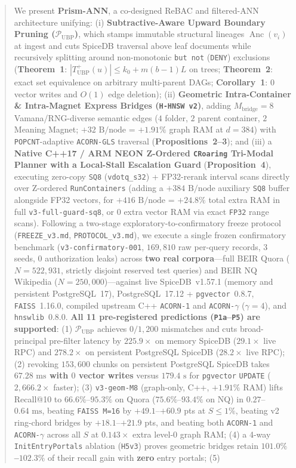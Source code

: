 \documentclass[conference]{IEEEtran}
\begin{document}
\begin{abstract}
We present \textbf{Prism-ANN}, a co-designed ReBAC and filtered-ANN architecture unifying: (i) \textbf{Subtractive-Aware Upward Boundary Pruning ($\mathcal{P}_{\text{UBP}}$)}, which stamps immutable structural lineages $\operatorname{Anc}(v_i)$ at ingest and cuts SpiceDB traversal above leaf documents while recursively splitting around non-monotonic \texttt{but not} (\texttt{DENY}) exclusions (\textbf{Theorem~1}: $|T_{\text{UBP}}^+(u)| \le k_0 + m(b-1)L$ on trees; \textbf{Theorem~2}: exact set equivalence on arbitrary multi-parent DAGs; \textbf{Corollary~1}: $0$ vector writes and $O(1)$ edge deletion); (ii) \textbf{Geometric Intra-Container \& Intra-Magnet Express Bridges (\texttt{H-HNSW v2})}, adding $M_{\text{bridge}}=8$ Vamana/RNG-diverse semantic edges ($4$ folder, $2$ parent container, $2$ Meaning Magnet; $+32\text{ B/node}$ = $+1.91\%$ graph RAM at $d=384$) with \texttt{POPCNT}-adaptive \texttt{ACORN-GLS} traversal (\textbf{Propositions~2--3}); and (iii) a \textbf{Native C++17 / ARM NEON Z-Ordered \texttt{CRoaring} Tri-Modal Planner with a Local-Stall Escalation Guard} (\textbf{Proposition~4}), executing zero-copy \texttt{SQ8} (\texttt{vdotq\_s32}) + FP32-rerank interval scans directly over Z-ordered \texttt{RunContainers} (adding a $+384\text{ B/node}$ auxiliary \texttt{SQ8} buffer alongside FP32 vectors, for $+416\text{ B/node}$ = $+24.8\%$ total extra RAM in full \texttt{v3-full-guard-sq8}, or $0$ extra vector RAM via exact \texttt{FP32} range scans). Following a two-stage exploratory-to-confirmatory freeze protocol (\texttt{FREEZE\_v3.md}, \texttt{PROTOCOL\_v3.md}), we execute a single frozen confirmatory benchmark (\texttt{v3-confirmatory-001}, $169{,}810$ raw per-query records, $3$ seeds, $0$ authorization leaks) across \textbf{two real corpora}---full BEIR Quora ($N=522{,}931$, strictly disjoint reserved test queries) and BEIR NQ Wikipedia ($N=250{,}000$)---against live SpiceDB~v1.57.1 (memory and persistent PostgreSQL~17), PostgreSQL~17.12 + \texttt{pgvector}~0.8.7, \texttt{FAISS}~1.16.0, compiled upstream C++ \texttt{ACORN-1} and \texttt{ACORN-$\gamma$} ($\gamma=4$), and \texttt{hnswlib}~0.8.0. \textbf{All 11 pre-registered predictions (\texttt{P1a}--\texttt{P5}) are supported}: (1) $\mathcal{P}_{\text{UBP}}$ achieves $0/1{,}200$ mismatches and cuts broad-principal pre-filter latency by \textbf{$225.9\times$} on memory SpiceDB ($29.1\times$ live RPC) and \textbf{$278.2\times$} on persistent PostgreSQL SpiceDB ($28.2\times$ live RPC); (2) revoking $153{,}600$ chunks on persistent PostgreSQL SpiceDB takes \textbf{$67.28\text{ ms}$ with $0$ vector writes} versus $179.4\text{ s}$ for \texttt{pgvector} \texttt{UPDATE} (\textbf{$2{,}666.2\times$} faster); (3) \texttt{v3-geom-M8} (graph-only, C++, $+1.91\%$ RAM) lifts Recall@10 to $66.6\%$--$95.3\%$ on Quora ($75.6\%$--$93.4\%$ on NQ) in $0.27$--$0.64\text{ ms}$, beating \texttt{FAISS M=16} by $+49.1$--$+60.9$ pts at $S \le 1\%$, beating v2 ring-chord bridges by $+18.1$--$+21.9$ pts, and beating both \texttt{ACORN-1} and \texttt{ACORN-$\gamma$} across all $S$ at $0.143\times$ extra level-0 graph RAM; (4) a 4-way \texttt{InitEntryPortals} ablation (\texttt{H5v3}) proves geometric bridges retain \textbf{$101.0\%$--$102.3\%$} of their recall gain with \textbf{zero} entry portals; (5) 
\end{abstract}
\end{document}
